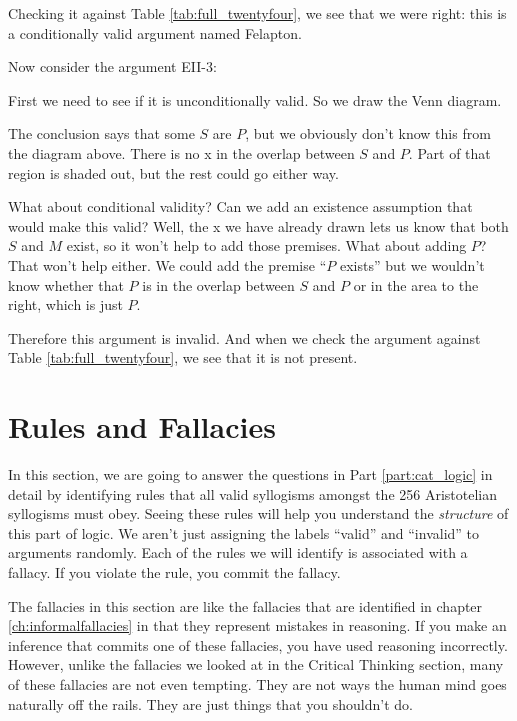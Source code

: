 Checking it against Table \ref{tab:full_twentyfour}, we see that we were right: this is a conditionally valid argument named Felapton.

Now consider the argument EII-3:

\begin{kormanize}
 \end{kormanize}

First we need to see if it is unconditionally valid. So we draw the Venn diagram.





The conclusion says that some $S$ are $P$, but we obviously don't know this from the diagram above. There is no x in the overlap between $S$ and $P$. Part of that region is shaded out, but the rest could go either way.

What about conditional validity? Can we add an existence assumption that would make this valid? Well, the x we have already drawn lets us know that both $S$ and $M$ exist, so it won't help to add those premises. What about adding $P$? That won't help either. We could add the premise ``$P$ exists'' but we wouldn't know whether that $P$ is in the overlap between $S$ and $P$ or in the area to the right, which is just $P$.

Therefore this argument is invalid. And when we check the argument against Table \ref{tab:full_twentyfour}, we see that it is not present.

\section{Rules and Fallacies}\label{sec:rules_and_fallacies}

In this section, we are going to answer the questions in Part \ref{part:cat_logic} in detail by identifying rules that all valid syllogisms amongst the 256 Aristotelian syllogisms must obey. Seeing these rules will help you understand the \emph{structure} of this part of logic. We aren't just  assigning the labels ``valid'' and ``invalid'' to arguments randomly. Each of the rules we will identify is associated with a fallacy. If you violate the rule, you commit the fallacy.

The fallacies in this section are like the fallacies that are identified in chapter \ref{ch:informalfallacies} in that they represent mistakes in reasoning. If you make an inference that commits one of these fallacies, you have used reasoning incorrectly. However, unlike the fallacies we looked at in the Critical Thinking section, many of these fallacies are not even tempting. They are not ways the human mind goes naturally off the rails. They are just things that you shouldn't do.

